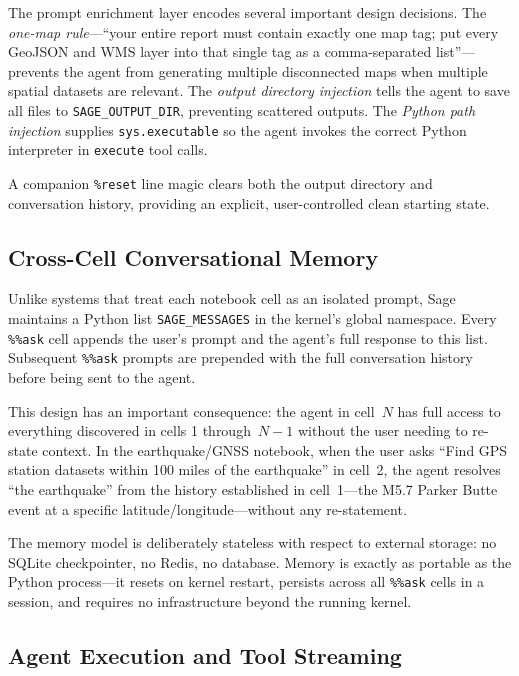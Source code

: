 \documentclass[10pt,twocolumn]{article}
\begin{document}
The prompt enrichment layer encodes several important design decisions. The \emph{one-map rule}---``your entire report must contain exactly one map tag; put every GeoJSON and WMS layer into that single tag as a comma-separated list''---prevents the agent from generating multiple disconnected maps when multiple spatial datasets are relevant. The \emph{output directory injection} tells the agent to save all files to \texttt{SAGE\_OUTPUT\_DIR}, preventing scattered outputs. The \emph{Python path injection} supplies \texttt{sys.executable} so the agent invokes the correct Python interpreter in \texttt{execute} tool calls.

A companion \texttt{\%reset} line magic clears both the output directory and conversation history, providing an explicit, user-controlled clean starting state.

\subsection{Cross-Cell Conversational Memory}

Unlike systems that treat each notebook cell as an isolated prompt, Sage maintains a Python list \texttt{SAGE\_MESSAGES} in the kernel's global namespace. Every \texttt{\%\%ask} cell appends the user's prompt and the agent's full response to this list. Subsequent \texttt{\%\%ask} prompts are prepended with the full conversation history before being sent to the agent.

This design has an important consequence: the agent in cell~$N$ has full access to everything discovered in cells 1 through~$N-1$ without the user needing to re-state context. In the earthquake/GNSS notebook, when the user asks ``Find GPS station datasets within 100 miles of the earthquake'' in cell~2, the agent resolves ``the earthquake'' from the history established in cell~1---the M5.7 Parker Butte event at a specific latitude/longitude---without any re-statement.

The memory model is deliberately stateless with respect to external storage: no SQLite checkpointer, no Redis, no database. Memory is exactly as portable as the Python process---it resets on kernel restart, persists across all \texttt{\%\%ask} cells in a session, and requires no infrastructure beyond the running kernel.

\subsection{Agent Execution and Tool Streaming}
\end{document}
